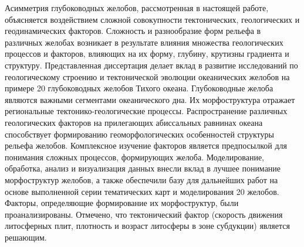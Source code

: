 Асимметрия глубоководных желобов, рассмотренная в настоящей работе, объясняется воздействием сложной совокупности тектонических, геологических и геодинамических факторов. Сложность и разнообразие форм рельефа в различных желобах возникает в результате влияния множества геологических процессов и факторов, влияющих на их форму, глубину, крутизны градиента и структуру. 
Представленная диссертация делает вклад в развитие исследований по геологическому строению и тектонической эволюции океанических желобов на примере 20 глубоководных желобов Тихого океана. Глубоководные желоба являются важными сегментами океанического дна. Их морфоструктура отражает региональные тектонико-геологические процессы. Распространение различных геологических факторов на прилегающих абиссальных равнинах океана способствует формированию геоморфологических особенностей структуры рельефа желобов. Комплексное изучение факторов является предпосылкой для понимания сложных процессов, формирующих желоба. Моделирование, обработка, анализ и визуализация данных внесли вклад в лучшее понимание морфоструктур желобов, а также обеспечили базу для дальнейших работ на основе выполненной серии тематических карт и моделирования 20 желобов. Факторы, определяющие формирование их морфоструктур, были проанализированы. Отмечено, что тектонический фактор (скорость движения литосферных плит, плотность и возраст литосферы в зоне субдукции) является решающим.

%


